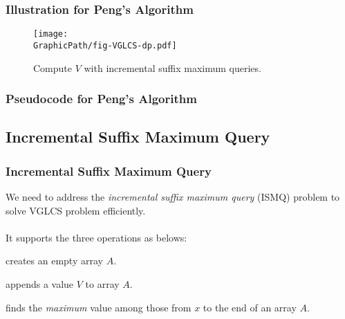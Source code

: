 \begin{frame}
    \frametitle{Illustration for Peng's Algorithm}
    \begin{figure}[!thb]
		\texttt{[image: \\GraphicPath/fig-VGLCS-dp.pdf]}
		\caption{Compute $V$ with incremental suffix maximum queries.}
		\label{fig:basic-dp-VGLCS}
	\end{figure}
\end{frame}

\begin{withoutheadline}
\begin{frame}
	\frametitle{Pseudocode for Peng's Algorithm}
	\begin{center}
		\scalebox{.7} { \begin{minipage}{1.2\textwidth}
			
			\end{minipage}
		}
	\end{center}
\end{frame}
\end{withoutheadline}

\subsection{Incremental Suffix Maximum Query}
\begin{frame}
    \frametitle{Incremental Suffix Maximum Query}

    We need to address the {\em incremental suffix maximum query} (ISMQ)
    problem to solve VGLCS problem efficiently.
    \\~\\
    It supports the three operations as belows:
    \begin{description}[align=right]
    	\setlength\itemsep{1em}
    	\item[{\sc Make}]
			creates an empty array $A$.
		\item[{\sc Append(V)}]
			appends a value $V$ to array $A$. 
		\item[{\sc Query(x)}]
			finds the {\em maximum} value among those from $x$ to the
			end of an array $A$.
    \end{description}
\end{frame}

